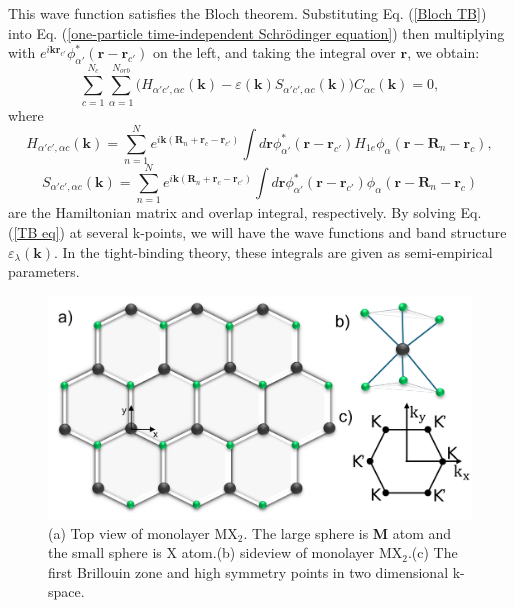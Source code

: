\documentclass[12pt,english,a4paper]{article}
\begin{document}
\quad This wave function satisfies the Bloch theorem. Substituting Eq. (\ref{Bloch TB}) into Eq. (\ref{one-particle time-independent Schrödinger equation}) then multiplying with $e^{i\textbf{k}\textbf{r}_{c'}} \phi_{\alpha'}^* (\textbf{r}-\textbf{r}_{c'})$ on the left, and taking the integral over $\textbf{r}$, we obtain:
	\begin{equation}
		\label{TB eq}
	\sum_{c=1}^{N_c} \sum_{\alpha = 1}^{N_{orb}}\big(H_{\alpha'c',\alpha c}(\textbf{k}) - \varepsilon(\textbf{k})S_{\alpha'c',\alpha c}(\textbf{k})\big) C_{\alpha c}(\textbf{k}) =0,
	\end{equation}
\quad where
	\begin{equation}
		H_{\alpha'c',\alpha c}(\textbf{k}) = \sum_{n=1}^N e^{i\textbf{k}(\textbf{R}_n +\textbf{r}_c -\textbf{r}_{c'})} \int d\textbf{r} \phi^*_{\alpha'}(\textbf{r}-\textbf{r}_{c'}) H_{1e} \phi_{\alpha}(\textbf{r}-\textbf{R}_n -\textbf{r}_c),
		\label{hopping energies}
	\end{equation}
	\begin{equation}
		S_{\alpha'c',\alpha c}(\textbf{k}) = \sum_{n=1}^N e^{i\textbf{k}(\textbf{R}_n +\textbf{r}_c -\textbf{r}_{c'})} \int d\textbf{r} \phi^*_{\alpha'}(\textbf{r}-\textbf{r}_{c'}) \phi_{\alpha}(\textbf{r}-\textbf{R}_n -\textbf{r}_c)
	\end{equation}
are the Hamiltonian matrix and overlap integral, respectively. By solving Eq. (\ref{TB eq}) at several k-points, we will have the wave functions and band structure $\varepsilon_\lambda(\textbf{k})$. In the tight-binding theory, these integrals are given as semi-empirical parameters.
	\begin{figure}
		\begin{center}
			\includegraphics[width=0.75\linewidth]{Images/RS.pdf}
			\caption[TMD structure and its first Brillouin zone]{(a) Top view of monolayer $\mathrm{MX}_2$. The large sphere is \textbf{M} atom and the small sphere is X atom.(b) sideview of monolayer $\mathrm{MX}_2$.(c) The first Brillouin zone and high symmetry points in two dimensional k-space.}
			\label{real space}
		\end{center}
	\end{figure}
\end{document}
